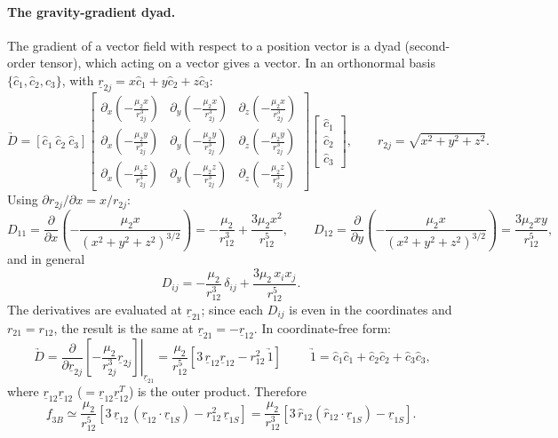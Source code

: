 \paragraph{The gravity-gradient dyad.} The gradient of a vector field with respect to a position vector is a dyad (second-order tensor),
which acting on a vector gives a vector. In an orthonormal basis $\{\hat c_1,\hat c_2,\hat c_3\}$, with $\underline r_{2j}=x\hat c_1+y\hat c_2+z\hat c_3$:
\begin{equation}
\underrightarrow{D}=[\hat c_1\ \hat c_2\ \hat c_3]
\begin{bmatrix}
\partial_x\!\left(-\frac{\mu_2x}{r_{2j}^3}\right)&\partial_y\!\left(-\frac{\mu_2x}{r_{2j}^3}\right)&\partial_z\!\left(-\frac{\mu_2x}{r_{2j}^3}\right)\\[3pt]
\partial_x\!\left(-\frac{\mu_2y}{r_{2j}^3}\right)&\partial_y\!\left(-\frac{\mu_2y}{r_{2j}^3}\right)&\partial_z\!\left(-\frac{\mu_2y}{r_{2j}^3}\right)\\[3pt]
\partial_x\!\left(-\frac{\mu_2z}{r_{2j}^3}\right)&\partial_y\!\left(-\frac{\mu_2z}{r_{2j}^3}\right)&\partial_z\!\left(-\frac{\mu_2z}{r_{2j}^3}\right)
\end{bmatrix}
\begin{bmatrix}\hat c_1\\ \hat c_2\\ \hat c_3\end{bmatrix},\qquad r_{2j}=\sqrt{x^2+y^2+z^2}.
\end{equation}
Using $\partial r_{2j}/\partial x=x/r_{2j}$:
\begin{equation}
D_{11}=\frac{\partial}{\partial x}\left(-\frac{\mu_2x}{(x^2+y^2+z^2)^{3/2}}\right)=-\frac{\mu_2}{r_{12}^3}+\frac{3\mu_2x^2}{r_{12}^5},\qquad
D_{12}=\frac{\partial}{\partial y}\left(-\frac{\mu_2x}{(x^2+y^2+z^2)^{3/2}}\right)=\frac{3\mu_2xy}{r_{12}^5},
\end{equation}
and in general
\begin{equation}
D_{ij}=-\frac{\mu_2}{r_{12}^3}\,\delta_{ij}+\frac{3\mu_2\,x_ix_j}{r_{12}^5}.
\end{equation}
The derivatives are evaluated at $\underline r_{21}$; since each $D_{ij}$ is even in the coordinates and $r_{21}=r_{12}$, the result is the same
at $\underline r_{21}=-\underline r_{12}$. In coordinate-free form:
\begin{equation}
\boxed{\;\underrightarrow{D}=\left.\frac{\partial}{\partial\underline r_{2j}}\left[-\frac{\mu_2}{r_{2j}^3}\underline r_{2j}\right]\right|_{\underline r_{21}}
=\frac{\mu_{2}}{r_{12}^{5}}\left[3\,\underline{r}_{12}\underline{r}_{12}-r_{12}^{2}\,\underrightarrow{1}\right]\;}
\qquad \underrightarrow{1}=\hat c_1\hat c_1+\hat c_2\hat c_2+\hat c_3\hat c_3 ,
\end{equation}
where $\underline r_{12}\underline r_{12}$ ($=\underline r_{12}\underline r_{12}^T$) is the outer product. Therefore
\begin{equation}
\underline f_{3B}\simeq\frac{\mu_2}{r_{12}^5}\left[3\,\underline r_{12}\,(\underline r_{12}\cdot\underline r_{1S})-r_{12}^2\,\underline r_{1S}\right]
=\frac{\mu_2}{r_{12}^3}\left[3\,\hat r_{12}(\hat r_{12}\cdot\underline r_{1S})-\underline r_{1S}\right].
\end{equation}

